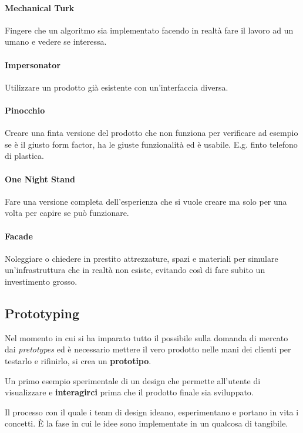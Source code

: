 \paragraph{Mechanical Turk} Fingere che un algoritmo sia implementato facendo in realtà fare il lavoro ad un umano e vedere se interessa.

\paragraph{Impersonator} Utilizzare un prodotto già esistente con un'interfaccia diversa.

\paragraph{Pinocchio} Creare una finta versione del prodotto che non funziona per verificare ad esempio se è il giusto form factor, ha le giuste funzionalità ed è usabile. E.g. finto telefono di plastica.

\paragraph{One Night Stand} Fare una versione completa dell'esperienza che si vuole creare ma solo per una volta per capire se può funzionare.

\paragraph{Facade} Noleggiare o chiedere in prestito attrezzature, spazi e materiali per simulare un'infrastruttura che in realtà non esiste, evitando così di fare subito un investimento grosso.

\subsection{Prototyping}
Nel momento in cui si ha imparato tutto il possibile sulla domanda di mercato dai \textit{pretotypes} ed è necessario mettere il vero prodotto nelle mani dei clienti per testarlo e rifinirlo, si crea un \textbf{prototipo}.

\begin{definition}[Prototipo]
	Un primo esempio sperimentale di un design che permette all'utente di visualizzare e \textbf{interagirci} prima che il prodotto finale sia sviluppato.
\end{definition}

\begin{definition}[Prototyping]
	Il processo con il quale i team di design ideano, esperimentano e portano in vita i concetti. È la fase in cui le idee sono implementate in un qualcosa di tangibile.
\end{definition}

